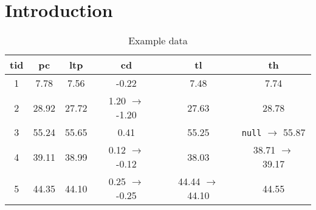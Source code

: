 \section{Introduction}
\label{sec:introduction}

\begin{table}[hb]%
    \caption{Example data}
    \label{tab:runningexampledata}
    \begin{tabular}{c||c|c|c|c|c}
        \toprule
        \textbf{tid} & \textbf{pc} & \textbf{ltp} & \textbf{cd} & \textbf{tl} & \textbf{th} \\
        \midrule
        1 & 7.78 & 7.56 & -0.22 & 7.48 & 7.74 \\
        2 & 28.92 & 27.72 & 1.20 $\rightarrow$ -1.20 & 27.63 & 28.78 \\
        3 & 55.24 & 55.65 & 0.41 & 55.25 & \texttt{null} $\rightarrow$ 55.87 \\
        4 & 39.11 & 38.99 & 0.12 $\rightarrow$ -0.12 & 38.03 & 38.71 $\rightarrow$ 39.17 \\
        5 & 44.35 & 44.10 & 0.25 $\rightarrow$ -0.25 & 44.44 $\rightarrow$ 44.10 & 44.55 \\
        \bottomrule
    \end{tabular}
\end{table}

